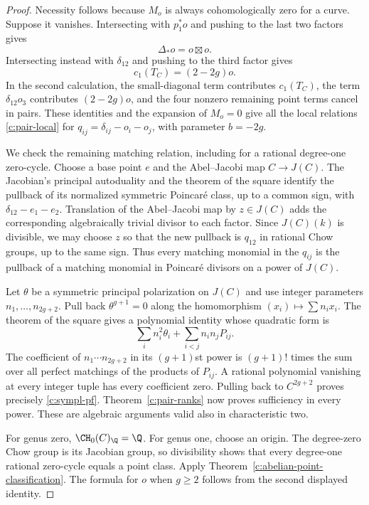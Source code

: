 \begin{proof}
Necessity follows because $M_o$ is always cohomologically zero for a curve. Suppose it vanishes. Intersecting with $p_1^*o$ and pushing to the last two factors gives
\[
 \Delta_*o=o\boxtimes o.
\]
Intersecting instead with $\delta_{12}$ and pushing to the third factor gives
\[
 c_1(T_C)=(2-2g)o.
\]
In the second calculation, the small-diagonal term contributes $c_1(T_C)$, the term $\delta_{12}o_3$ contributes $(2-2g)o$, and the four nonzero remaining point terms cancel in pairs. These identities and the expansion of $M_o=0$ give all the local relations \eqref{c:pair-local} for $q_{ij}=\delta_{ij}-o_i-o_j$, with parameter $b=-2g$.

We check the remaining matching relation, including for a rational degree-one zero-cycle. Choose a base point $e$ and the Abel--Jacobi map $C\to J(C)$. The Jacobian's principal autoduality and the theorem of the square identify the pullback of its normalized symmetric Poincar\'e class, up to a common sign, with $\delta_{12}-e_1-e_2$. Translation of the Abel--Jacobi map by $z\in J(C)$ adds the corresponding algebraically trivial divisor to each factor. Since $J(C)(k)$ is divisible, we may choose $z$ so that the new pullback is $q_{12}$ in rational Chow groups, up to the same sign. Thus every matching monomial in the $q_{ij}$ is the pullback of a matching monomial in Poincar\'e divisors on a power of $J(C)$.

Let $\theta$ be a symmetric principal polarization on $J(C)$ and use integer parameters $n_1,\ldots,n_{2g+2}$. Pull back $\theta^{g+1}=0$ along the homomorphism $(x_i)\mapsto\sum n_ix_i$. The theorem of the square gives a polynomial identity whose quadratic form is
\[
 \sum_i n_i^2\theta_i+\sum_{i<j}n_in_jP_{ij}.
\]
The coefficient of $n_1\cdots n_{2g+2}$ in its $(g+1)$st power is $(g+1)!$ times the sum over all perfect matchings of the products of $P_{ij}$. A rational polynomial vanishing at every integer tuple has every coefficient zero. Pulling back to $C^{2g+2}$ proves precisely \eqref{c:sympl-pf}. Theorem~\ref{c:pair-ranks} now proves sufficiency in every power. These are algebraic arguments valid also in characteristic two.

For genus zero, $\CH_0(C)_\Q=\Q$. For genus one, choose an origin. The degree-zero Chow group is its Jacobian group, so divisibility shows that every degree-one rational zero-cycle equals a point class. Apply Theorem~\ref{c:abelian-point-classification}. The formula for $o$ when $g\geq2$ follows from the second displayed identity.
\end{proof}

